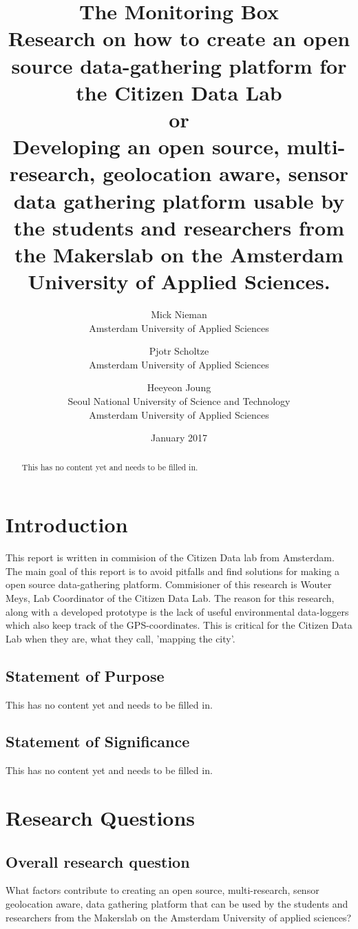 \documentclass{report}
\title{The Monitoring Box \\ 
Research on how to create an open source data-gathering platform for the Citizen Data Lab
\\ or  \\
Developing an open source, multi-research, geolocation aware, sensor data gathering platform usable by the students and researchers from the Makerslab on the Amsterdam University of Applied Sciences.}
\author{Mick Nieman \\ Amsterdam University of Applied Sciences \and
 Pjotr Scholtze \\ Amsterdam University of Applied Sciences \and
 Heeyeon Joung \\ Seoul National University of Science and Technology \\Amsterdam University of Applied Sciences}
\date{January 2017}
\begin{document}
\maketitle

\begin{abstract}
This has no content yet and needs to be filled in.     
\end{abstract}

\tableofcontents

\chapter{Introduction}
This report is written in commision of the Citizen Data lab from Amsterdam. The main goal of this report is to avoid pitfalls and find solutions for making a open source data-gathering platform. Commisioner of this research is Wouter Meys, Lab Coordinator of the Citizen Data Lab. The reason for this research, along with a developed prototype is the lack of useful environmental data-loggers which also keep track of the GPS-coordinates. This is critical for the Citizen Data Lab when they are, what they call, 'mapping the city'. 

\section{Statement of Purpose}
This has no content yet and needs to be filled in. 

\section{Statement of Significance}
This has no content yet and needs to be filled in. 

\chapter{Research Questions}

\section{Overall research question}
What factors contribute to creating an open source, multi-research, sensor geolocation aware, data gathering platform that can be used by the students and researchers from the Makerslab on the Amsterdam University of applied sciences?
\end{document}
